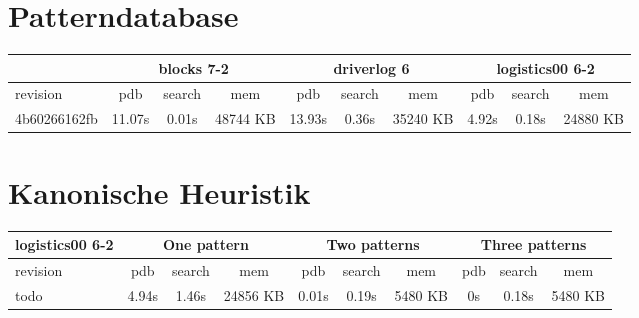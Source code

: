 \documentclass[a4paper,12pt]{scrartcl}
\begin{document}
\section{Patterndatabase}

\begin{tabular}{|l|c|c|c|c|c|c|c|c|c|}\hline
& \multicolumn{3}{c|}{blocks 7-2} & \multicolumn{3}{c|}{driverlog 6} & \multicolumn{3}{c|}{logistics00 6-2}\\\hline
revision & pdb & search & mem & pdb & search & mem & pdb & search & mem\\\hline
4b60266162fb & 11.07s & 0.01s & 48744 KB & 13.93s & 0.36s & 35240 KB & 4.92s & 0.18s & 24880 KB\\\hline
\end{tabular}

\section{Kanonische Heuristik}

\begin{tabular}{|l|c|c|c|c|c|c|c|c|c|}\hline
logistics00 6-2 & \multicolumn{3}{c|}{One pattern} & \multicolumn{3}{c|}{Two patterns} & \multicolumn{3}{c|}{Three patterns}\\\hline
revision & pdb & search & mem & pdb & search & mem & pdb & search & mem\\\hline
todo & 4.94s & 1.46s & 24856 KB & 0.01s & 0.19s & 5480 KB & 0s & 0.18s & 5480 KB\\\hline
\end{tabular}
\end{document}
